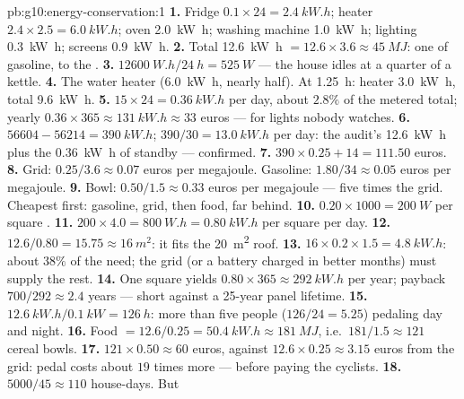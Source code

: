 \begin{solution}{pb:g10:energy-conservation:1}
\textbf{1.} Fridge $0.1 \times 24 = \qty{2.4}{kW.h}$; heater
$2.4 \times 2.5 = \qty{6.0}{kW.h}$; oven \qty{2.0}{kW.h}; washing
machine \qty{1.0}{kW.h}; lighting \qty{0.3}{kW.h}; screens
\qty{0.9}{kW.h}.
\textbf{2.} Total \qty{12.6}{kW.h} $= 12.6 \times 3.6 \approx
\qty{45}{MJ}$: one  of gasoline, to the .
\textbf{3.} $\qty{12600}{W.h}/\qty{24}{h} = \qty{525}{W}$ --- the
house idles at a quarter of a kettle.
\textbf{4.} The water heater (\qty{6.0}{kW.h}, nearly half). At
\qty{1.25}{h}: heater \qty{3.0}{kW.h}, total \qty{9.6}{kW.h}.
\textbf{5.} $15 \times 24 = \qty{0.36}{kW.h}$ per day, about
$2.8\%$ of the metered total; yearly $0.36 \times 365 \approx
\qty{131}{kW.h} \approx 33$ euros --- for lights nobody watches.
\textbf{6.} $56604 - 56214 = \qty{390}{kW.h}$;
$390/30 = \qty{13.0}{kW.h}$ per day: the audit's \qty{12.6}{kW.h}
plus the \qty{0.36}{kW.h} of standby --- confirmed.
\textbf{7.} $390 \times 0.25 + 14 = 111.50$ euros.
\textbf{8.} Grid: $0.25/3.6 \approx 0.07$ euros per megajoule.
Gasoline: $1.80/34 \approx 0.05$ euros per megajoule.
\textbf{9.} Bowl: $0.50/1.5 \approx 0.33$ euros per megajoule ---
five times the grid. Cheapest first: gasoline, grid, then food,
far behind.
\textbf{10.} $0.20 \times 1000 = \qty{200}{W}$ per square .
\textbf{11.} $200 \times 4.0 = \qty{800}{W.h} = \qty{0.80}{kW.h}$
per square  per day.
\textbf{12.} $12.6/0.80 = 15.75 \approx \qty{16}{m^2}$: it fits
the \qty{20}{m^2} roof.
\textbf{13.} $16 \times 0.2 \times 1.5 = \qty{4.8}{kW.h}$: about
$38\%$ of the need; the grid (or a battery charged in better
months) must supply the rest.
\textbf{14.} One square  yields $0.80 \times 365 \approx
\qty{292}{kW.h}$ per year; payback $700/292 \approx 2.4$ years ---
short against a 25-year panel lifetime.
\textbf{15.} $\qty{12.6}{kW.h}/\qty{0.1}{kW} = \qty{126}{h}$:
more than five people ($126/24 = 5.25$) pedaling day and night.
\textbf{16.} Food $= 12.6/0.25 = \qty{50.4}{kW.h} \approx
\qty{181}{MJ}$, i.e.\ $181/1.5 \approx 121$ cereal bowls.
\textbf{17.} $121 \times 0.50 \approx 60$ euros, against
$12.6 \times 0.25 \approx 3.15$ euros from the grid: pedal 
costs about $19$ times more --- before paying the cyclists.
\textbf{18.} $5000/45 \approx 110$ house-days. But

\end{solution}
